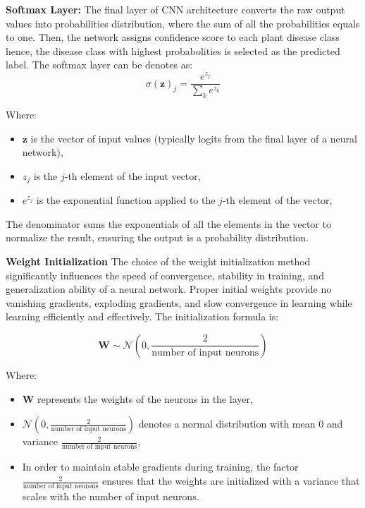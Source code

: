 \textbf{Softmax Layer:}
The final layer of CNN architecture converts the raw output values into probabilities distribution, where the sum of all the probabilities
equals to one. Then, the network assigns confidence score to each plant disease class hence, the disease class with highest probabolities
is selected as the predicted label. The softmax layer can be denotes as:
\begin{equation}
    \sigma(\mathbf{z})_j = \frac{e^{z_j}}{\sum_{k} e^{z_k}}
\end{equation}

Where:
\begin{itemize}
    

\item \( \mathbf{z} \) is the vector of input values (typically logits from the final layer of a neural network),
\item \( z_j \) is the \( j \)-th element of the input vector,
\item \( e^{z_j} \) is the exponential function applied to the \( j \)-th element of the vector,
\end{itemize}
The denominator sums the exponentials of all the elements in the vector to normalize the result, ensuring the output is a probability distribution.

\textbf{Weight Initialization}
The choice of the weight initialization method significantly influences the speed of convergence, stability in training, and 
generalization ability of a neural network. Proper initial weights provide no vanishing gradients, exploding gradients, and 
slow convergence in learning while learning efficiently and effectively. The initialization formula is:

\begin{equation}
    \mathbf{W} \sim \mathcal{N}\left(0, \frac{2}{\text{number of input neurons}}\right)
\end{equation}

Where:
\begin{itemize}
    \item \( \mathbf{W} \) represents the weights of the neurons in the layer,
    \item \( \mathcal{N}(0, \frac{2}{\text{number of input neurons}}) \) denotes a normal distribution with mean 0 and variance \( \frac{2}{\text{number of input neurons}} \),
    \item  In order to maintain stable gradients during training, the factor \( \frac{2}{\text{number of input neurons}} \)
    ensures that the weights are initialized with a variance that scales with the number of input neurons.
\end{itemize}




